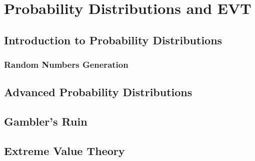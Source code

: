 
\section{Probability Distributions and EVT}


\subsection{Introduction to Probability Distributions}

\subsubsection{Random Numbers Generation}

\subsection{Advanced Probability Distributions}

\subsection{Gambler's Ruin}

\subsection{Extreme Value Theory}


